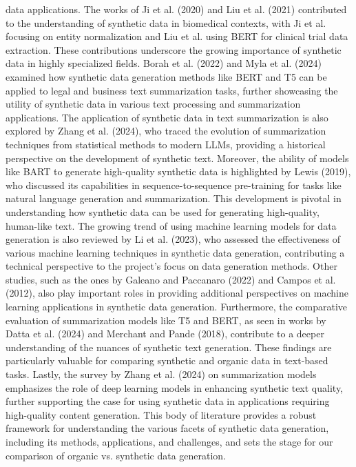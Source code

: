 \documentclass[sigplan,screen]{acmart}
\begin{document}
data applications. The works of Ji et al. (2020)\cite{ji2020bert} and Liu et al. (2021)\cite{liu2021clinical} contributed to the understanding of synthetic data in biomedical contexts, with Ji et al. focusing on entity normalization and Liu et al.\cite{liu2021clinical} using BERT for clinical trial data extraction. These contributions underscore the growing importance of synthetic data in highly specialized fields. Borah et al. (2022)\cite{borah2022comparative} and Myla et al. (2024)\cite{myla2024enhanced} examined how synthetic data generation methods like BERT and T5 can be applied to legal and business text summarization tasks, further showcasing\cite{chen2021news} the utility of synthetic data in various text processing and summarization applications. The application of synthetic data in text summarization is also explored by Zhang et al. (2024)\cite{zhang2024systematic}, who traced the evolution of summarization techniques from statistical methods to modern LLMs, providing a historical perspective on the development of synthetic text. Moreover, the ability of models like BART to generate high-quality synthetic data is highlighted by Lewis (2019)\cite{lewis2019bart}, who discussed its capabilities in sequence-to-sequence pre-training for tasks like natural language generation and summarization. This development is pivotal\cite{asmitha2024summarizing} in understanding how synthetic data can be used for generating high-quality, human-like text. The growing trend of using machine learning models for data generation is also reviewed by Li et al. (2023)\cite{li2023syntheticdatagenerationlarge}, who assessed the effectiveness of various machine learning techniques in synthetic data generation, contributing a technical perspective to the project’s focus on data generation methods. Other studies, such as the ones by Galeano and Paccanaro (2022)\cite{galeano2022machine} and Campos et al. (2012)\cite{campos2012biomedical}, also play important roles in providing additional perspectives on machine learning applications in synthetic data generation. Furthermore, the comparative evaluation of summarization models like T5 and BERT, as seen in works by Datta et al. (2024)\cite{myla2024enhanced} and Merchant and Pande (2018)\cite{merchant2018nlp}, contribute to a deeper understanding of the nuances of synthetic text generation. These findings are particularly valuable for comparing synthetic and organic data in text-based tasks. Lastly, the survey by Zhang et al. (2024)\cite{zhang2024systematic} on summarization models emphasizes the role of deep learning models in enhancing synthetic text quality, further supporting the case for using synthetic data in applications requiring high-quality content generation.\cite{dharrao2024summarizing} This body of literature provides a robust framework for understanding the various facets of synthetic data generation, including its methods, applications, and challenges, and sets the stage for our comparison of organic vs. synthetic data generation.
\end{document}
